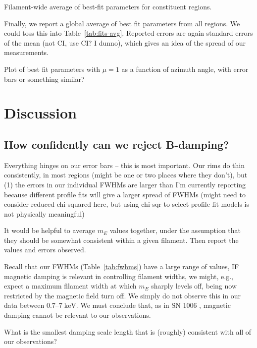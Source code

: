 \documentclass[iop, apj, numberedappendix, twocolappendix]{emulateapj}
\newcommand*{\mt}{\mathrm}
\newcommand*{\unit}[1]{\;\mt{#1}}  %
\begin{document}
\begin{table*}
    \scriptsize
    \centering
    \caption{Filament-wide average of best-fit parameters for constituent regions.
    \label{tab:fits-avg}}
    
\end{table*}

Finally, we report a global average of best fit parameters from all regions.
We could toss this into Table~\ref{tab:fits-avg}.  Reported errors are
again standard errors of the mean (not CI, use CI? I dunno), which gives an
idea of the spread of our measurements.

Plot of best fit parameters with $\mu=1$ as a function of azimuth angle, with
error bars or something similar?

\section{Discussion}

\subsection{How confidently can we reject B-damping?}

Everything hinges on our error bars -- this is most important.  Our rims do
thin consistently, in most regions (might be one or two places where they
don't), but (1) the errors in our individual FWHMs are larger than I'm
currently reporting because different profile fits will give a larger spread of
FWHMs (might need to consider reduced chi-squared here, but using chi-sqr to
select profile fit models is not physically meaningful)

It would be helpful to average $m_E$ values together, under the
assumption that they should be somewhat consistent within a given filament.
Then report the values and errors observed.

Recall that our FWHMs (Table~\ref{tab:fwhms}) have a large range of values,
IF magnetic damping is relevant in controlling filament widths, we might, e.g.,
expect a maximum filament width at which $m_E$ sharply levels off, being now
restricted by the magnetic field turn off.  We simply do not observe this in
our data between $0.7$--$7 \unit{keV}$.  We must conclude that, as in SN 1006
, magnetic damping cannot be relevant to our
observations.

What is the smallest damping scale length that is (roughly) consistent with all
of our observations?
\end{document}

